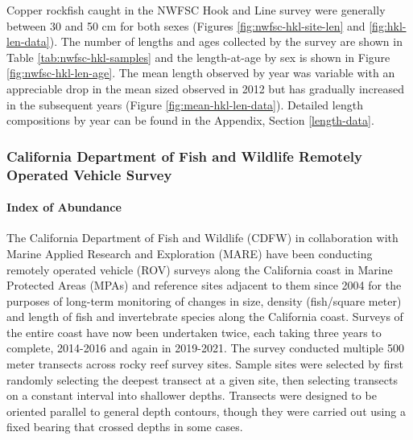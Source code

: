 \documentclass[11pt,
  english,
  letterpaper,
]{article}
\begin{document}
\hfill\break

Copper rockfish caught in the NWFSC Hook and Line survey were generally between 30 and 50 cm for both sexes (Figures \ref{fig:nwfsc-hkl-site-len} and \ref{fig:hkl-len-data}). The number of lengths and ages collected by the survey are shown in Table \ref{tab:nwfsc-hkl-samples} and the length-at-age by sex is shown in Figure \ref{fig:nwfsc-hkl-len-age}. The mean length observed by year was variable with an appreciable drop in the mean sized observed in 2012 but has gradually increased in the subsequent years (Figure \ref{fig:mean-hkl-len-data}). Detailed length compositions by year can be found in the Appendix, Section \ref{length-data}.

\hypertarget{california-department-of-fish-and-wildlife-remotely-operated-vehicle-survey}{%
\subsubsection{California Department of Fish and Wildlife Remotely Operated Vehicle Survey}\label{california-department-of-fish-and-wildlife-remotely-operated-vehicle-survey}}

\hypertarget{index-of-abundance-2}{%
\paragraph{Index of Abundance}\label{index-of-abundance-2}}

The California Department of Fish and Wildlife (CDFW) in collaboration with Marine Applied Research and Exploration (MARE) have been conducting remotely operated vehicle (ROV) surveys along the California coast in Marine Protected Areas (MPAs) and reference sites adjacent to them since 2004 for the purposes of long-term monitoring of changes in size, density (fish/square meter) and length of fish and invertebrate species along the California coast. Surveys of the entire coast have now been undertaken twice, each taking three years to complete, 2014-2016 and again in 2019-2021. The survey conducted multiple 500 meter transects across rocky reef survey sites. Sample sites were selected by first randomly selecting the deepest transect at a given site, then selecting transects on a constant interval into shallower depths. Transects were designed to be oriented parallel to general depth contours, though they were carried out using a fixed bearing that crossed depths in some cases.
\end{document}
